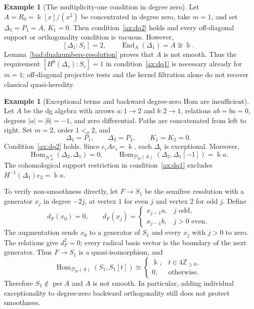 \documentclass[11pt,a4paper]{article}
\newcommand{\D}{\mathcal D}
\renewcommand{\H}{\mathcal H}
\newcommand{\ZZ}{\mathbb{Z}}
\newcommand{\std}{\Delta}
\DeclareMathOperator{\fd}{fd}
\DeclareMathOperator{\Hom}{Hom}
\DeclareMathOperator{\End}{End}
\DeclareMathOperator{\per}{per}
\theoremstyle{plain}
\theoremstyle{definition}
\newtheorem{example}[theorem]{Example}
\numberwithin{equation}{section}
\begin{document}
\begin{example}[The multiplicity-one condition in degree zero]
\label{bad:ordinary-diagonal}
Let $A=R_0=\Bbbk[x]/(x^2)$ be concentrated in degree zero, take
$m=1$, and set $\std_1=P_1=A$, $K_1=0$. Then
condition~\ref{ax:dq2} holds and every off-diagonal support or
orthogonality condition is vacuous. However,
\[
 [\std_1:S_1]=2,\qquad \End_A(\std_1)=A\not\cong\Bbbk.
\]
Lemma~\ref{bad:dualnumbers-resolution} proves that $A$ is not smooth.
Thus the requirement $[H^0(\std_v):S_v]=1$ in
condition~\ref{ax:dq1} is necessary
already for $m=1$; off-diagonal projective tests and the kernel
filtration alone do not recover classical quasi-heredity.
\end{example}

\begin{example}[Exceptional terms and backward degree-zero Hom are insufficient]
\label{bad:cycle}
Let $A$ be the dg algebra with arrows
$a:1\to2$ and $b:2\to1$, relations $ab=ba=0$, degrees
$|a|=|b|=-1$, and zero differential. Paths are concatenated from left
to right. Set $m=2$, order $1<_\sigma2$, and
\[
 \std_1=P_1,\qquad\std_2=P_2,\qquad K_1=K_2=0.
\]
Condition~\ref{ax:dq2} holds. Since $e_iAe_i=\Bbbk$, each
$\std_i$ is exceptional. Moreover,
\begin{equation}\label{bad:cycle-backward}
 \Hom_{\H_A^2}(\std_2,\std_1)=0,
 \qquad
 \Hom_{\D_{\fd}(A)}(\std_2,\std_1[-1])=\Bbbk a.
\end{equation}
The cohomological support restriction in condition~\ref{ax:dq1}
excludes $H^{-1}(\std_1)e_2=\Bbbk a$.

To verify non-smoothness directly, let $F\to S_1$ be the semifree
resolution with a generator $x_j$ in degree $-2j$, at vertex $1$
for even $j$ and vertex $2$ for odd $j$. Define
\begin{equation}\label{bad:cycle-resolution}
 d_F(x_0)=0,\qquad
 d_F(x_j)=
 \begin{cases}
 x_{j-1}a,&j\text{ odd},\\
 x_{j-1}b,&j>0\text{ even}.
 \end{cases}
\end{equation}
The augmentation sends $x_0$ to a generator of $S_1$ and every
$x_j$ with $j>0$ to zero. The relations give $d_F^2=0$; every radical
basis vector is the boundary of the next generator. Thus $F\to S_1$
is a quasi-isomorphism, and
\begin{equation}\label{bad:cycle-ext}
 \Hom_{\D_{\fd}(A)}(S_1,S_1[t])\cong
 \begin{cases}\Bbbk,&t\in4\ZZ_{\geq0},\\0,&\text{otherwise}.
 \end{cases}
\end{equation}
Therefore $S_1\notin\per A$ and $A$ is not smooth. In particular,
adding individual exceptionality to degree-zero backward
orthogonality still does not protect smoothness.
\end{example}
\end{document}
